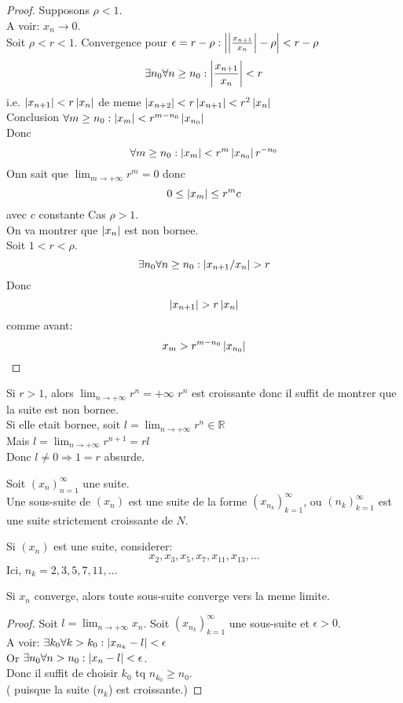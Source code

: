 \documentclass[../main.tex]{subfiles}
\begin{document}
\begin{proof}
Supposons $\rho < 1$.\\
A voir: $x_n \to 0$.\\
Soit $\rho < r < 1$.
Convergence pour $\epsilon = r - \rho: \left\vert\left\vert \frac{x_{n+1} }{x_n}\right\vert - \rho\right\vert < r - \rho$
\[ 
	\exists n_0 \forall n \geq n_0: \left\vert \frac{x_{n+1}}{x_n}\right\vert < r
\]
i.e. $\left\vert x_{n+1} \right\vert < r \left\vert x_n\right\vert$ de meme
$\left\vert x_{n+2}\right\vert < r \left\vert x_{n+1} \right\vert < r^{2}\left\vert x_n\right\vert$\\

Conclusion $\forall m \geq n_0: \left\vert x_{m} \right\vert < r ^{m-n_0} \left\vert x_{n_0}\right\vert $\\
Donc
\[ 
	\forall m \geq n_0: \left\vert x_m\right\vert < r^{m} \left\vert x_{n_0}\right\vert r^{-n_0} 
\]
Onn sait que $ \lim_{m \to  + \infty} r ^{m} =0$ donc
\[ 
	0 \leq \left\vert x_m\right\vert \leq r^{m} c	
\]
avec $c$ constante
Cas $\rho >1$.\\
On va montrer que 
$\left\vert x_n\right\vert$ est non bornee.\\
Soit $1 < r< \rho$.
\[ 
	\exists n_0 \forall n \geq n_0: \left\vert x_{n+1}/x_n\right\vert > r
\]
Donc
\[ 
	\left\vert x_{n+1} \right\vert > r \left\vert x_n\right\vert
\]
comme avant:
\[ 
	x_m > r^{m-n_0} \left\vert x_{n_0}\right\vert 
\]
\end{proof}
\begin{rmq}
Si $r >1$, alors $ \lim_{n \to  + \infty} r ^{n} = + \infty $
$r^{n}$ est croissante donc il suffit de montrer que la suite est non bornee.\\
Si elle etait bornee, soit $l = \lim_{n \to  + \infty} r^{n} \in \mathbb{R}$\\
Mais $l = \lim_{n \to  + \infty} r^{n+1} = r l$\\
Donc $l\neq 0 \Rightarrow  1 =r $ absurde.
\end{rmq}
\begin{defn}\label{defn:sous_suite}
	Soit $(x_n)_{n=1} ^{\infty }$ une suite.\\
	Une sous-suite de $(x_n)$ est une suite de la forme $(x_{n_k})_{k=1} ^{\infty }$, ou $(n_k)_{k=1} ^{\infty }$ est une suite strictement croissante de $N$.
\end{defn}
\begin{exemple}
	Si $(x_n)$ est une suite, considerer:
	\[ 
	x_2,x_3,x_5,x_7,x_{11},x_{13},\ldots
	\]
	Ici, $n_k = 2,3,5,7,11,\ldots$
\end{exemple}
\begin{propo}
Si $x_n$ converge, alors toute sous-suite converge vers la meme limite.
\end{propo}
\begin{proof}
Soit $l= \lim_{n \to  + \infty} x_n$. Soit $( x_{ n_k } )_{k=1} ^{\infty }$ une sous-suite et $\epsilon > 0$.\\
A voir: $\exists k_0 \forall k > k_0 : \left\vert x_{n_k} -l\right\vert < \epsilon$\\
Or $\exists n_0 \forall n > n_0: \left\vert x_n -l\right\vert < \epsilon$.\\
Donc il suffit de choisir $k_0$ tq $n_{k_0} \geq n_0$. \\
( puisque la suite ($n_k$) est croissante.)
\end{proof}
\end{document}
